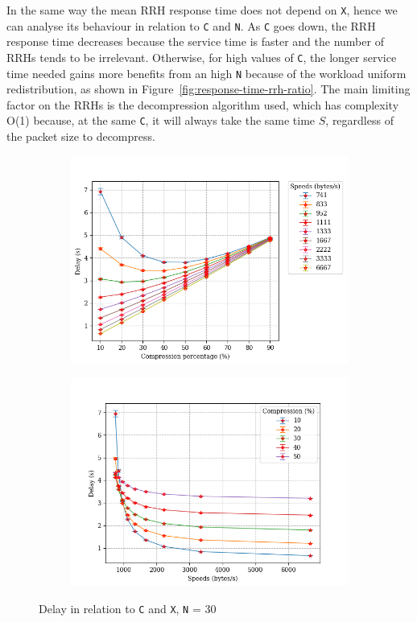 \documentclass[11pt,a4paper,oneside, openright]{article}
\begin{document}
In the same way the mean RRH response time does not depend on \texttt{X}, hence we can analyse its behaviour in relation to \texttt{C} and \texttt{N}.
As \texttt{C} goes down, the RRH response time decreases because the service time is faster and the number of RRHs tends to be irrelevant. Otherwise, for high values of \texttt{C}, the longer service time needed gains more benefits from an high \texttt{N} because of the workload uniform redistribution, as shown in Figure~\ref{fig:response-time-rrh-ratio}.
The main limiting factor on the RRHs is the decompression algorithm used, which has complexity O(1) because, at the same \texttt{C}, it will always take the same time $ S $, regardless of the packet size to decompress.
\begin{figure}[H]
	\centering
	\begin{subfigure}{.5\textwidth}
		\centering
		\includegraphics[width=\linewidth]{images/c-vs-delay-n-30}
		\caption{}
		\label{fig:c-vs-delay-n-30}
	\end{subfigure}%
	\begin{subfigure}{.5\textwidth}
		\centering
		\includegraphics[width=\linewidth]{images/s-vs-delay-n-30}
		\caption{}
		\label{fig:s-vs-delay-n-30}
	\end{subfigure}
	\caption{Delay in relation to \texttt{C} and \texttt{X}, \texttt{N} = 30}
	\label{fig:delay-n-30}
\end{figure}
\end{document}
